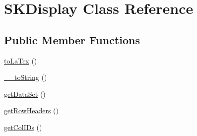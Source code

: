 \hypertarget{class_s_k_display}{}\section{S\+K\+Display Class Reference}
\label{class_s_k_display}
\subsection*{Public Member Functions}
\begin{DoxyCompactItemize}
\item 
\hyperlink{class_s_k_display_a5a615176f4c5d2501e52a63aa284ddb7}{to\+La\+Tex} ()
\item 
\hyperlink{class_s_k_display_aa138ba693f4e3d6b568e56f02dc18ea0}{\+\_\+\+\_\+to\+String} ()
\item 
\hyperlink{class_s_k_display_af83a05d9139b8c80a0fc690f4bbd6c64}{get\+Data\+Set} ()
\item 
\hyperlink{class_s_k_display_a613ccad3378b8f9d3f7b8032ba7ab66d}{get\+Row\+Headers} ()
\item 
\hyperlink{class_s_k_display_a44a35ac2934ef082b4bf1051c4fce7eb}{get\+Col\+I\+Ds} ()
\end{DoxyCompactItemize}
